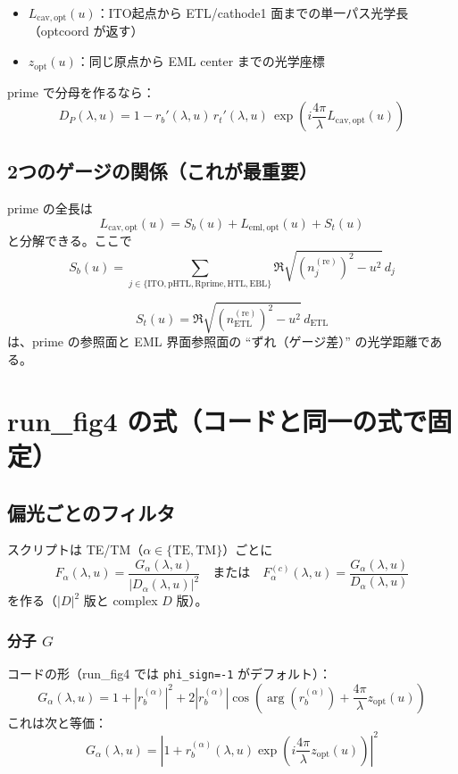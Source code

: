 \documentclass[a4paper,11pt]{article}
\begin{document}
\begin{itemize}
\item \(L_{\mathrm{cav,opt}}(u)\)：ITO起点から ETL/cathode1 面までの単一パス光学長（optcoord が返す）
\item \(z_{\mathrm{opt}}(u)\)：同じ原点から EML center までの光学座標
\end{itemize}

prime で分母を作るなら：
\[
\boxed{
D_P(\lambda,u)=
1-r_b'(\lambda,u)\,r_t'(\lambda,u)\,
\exp\!\left(i\frac{4\pi}{\lambda}L_{\mathrm{cav,opt}}(u)\right)
}
\]

\subsection{2つのゲージの関係（これが最重要）}
prime の全長は
\[
L_{\mathrm{cav,opt}}(u)=S_b(u)+L_{\mathrm{eml,opt}}(u)+S_t(u)
\]
と分解できる。ここで
\begin{equation}
S_b(u) =
\sum_{j\in\{\mathrm{ITO,pHTL,Rprime,HTL,EBL}\}}
\Re\sqrt{(n_j^{(\mathrm{re})})^2-u^2}\,d_j
\end{equation}

\begin{equation}
S_t(u) =
\Re\sqrt{(n_{\mathrm{ETL}}^{(\mathrm{re})})^2-u^2}\,d_{\mathrm{ETL}}
\end{equation}
は、prime の参照面と EML 界面参照面の ``ずれ（ゲージ差）'' の光学距離である。

\section{run\_fig4 の式（コードと同一の式で固定）}

\subsection{偏光ごとのフィルタ}
スクリプトは TE/TM（\(\alpha\in\{\mathrm{TE,TM}\}\)）ごとに
\[
F_\alpha(\lambda,u)=\frac{G_\alpha(\lambda,u)}{|D_\alpha(\lambda,u)|^2}
\quad\text{または}\quad
F_\alpha^{(c)}(\lambda,u)=\frac{G_\alpha(\lambda,u)}{D_\alpha(\lambda,u)}
\]
を作る（\(|D|^2\) 版と complex \(D\) 版）。

\subsubsection{分子 \(G\)}
コードの形（run\_fig4 では \texttt{phi\_sign=-1} がデフォルト）：
\[
\boxed{
G_\alpha(\lambda,u)=
1+|r_b^{(\alpha)}|^2
+2|r_b^{(\alpha)}|\cos\!\left(\arg(r_b^{(\alpha)})+\frac{4\pi}{\lambda}z_{\mathrm{opt}}(u)\right)
}
\]
これは次と等価：
\[
G_\alpha(\lambda,u)=
\left|1+r_b^{(\alpha)}(\lambda,u)\exp\!\left(i\frac{4\pi}{\lambda}z_{\mathrm{opt}}(u)\right)\right|^2
\]
\end{document}
